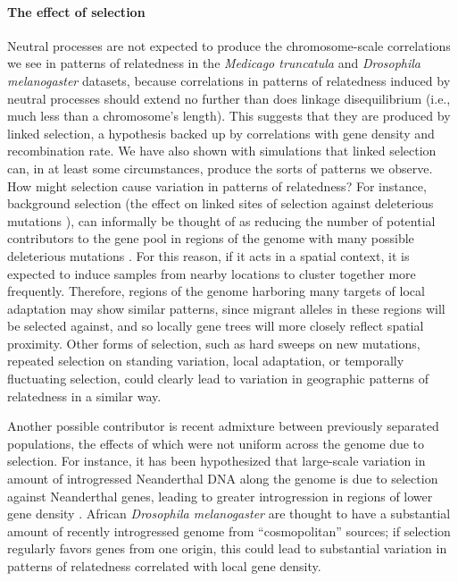 \documentclass[11pt, oneside]{article}   	%
\newcommand\citet{\cite}
\newcommand\citep{\cite}
\renewcommand{\revpoint}[2]{\relax}
\renewcommand{\llabel}[1]{\relax}
\begin{document}
\paragraph{The effect of selection}
Neutral processes are not expected to produce the chromosome-scale correlations we see in
patterns of relatedness 
in the \textit{Medicago truncatula} and \textit{Drosophila melanogaster} datasets, \llabel{ll:not_neutral}
because correlations in patterns of relatedness induced by neutral processes \revpoint{AE}{4}
should extend no further than does linkage disequilibrium
(i.e., much less than a chromosome's length).
This suggests that they are produced by linked selection,
a hypothesis backed up by correlations with gene density and recombination rate.
We have also shown with simulations that linked selection can, in at least some circumstances,
produce the sorts of patterns we observe.
How might selection cause variation in patterns of relatedness?
For instance, background selection
(the effect on linked sites of selection against deleterious mutations
\citet{charlesworth1993effect,charlesworth2013background}),
can informally be thought of as reducing the number of potential contributors to the gene pool 
in regions of the genome with many possible deleterious mutations \citep{hudson1995deleterious}.
For this reason, if it acts in a spatial context, it is expected to induce samples from nearby locations to cluster together more frequently.
Therefore, regions of the genome harboring many targets of local adaptation may show similar patterns,
since migrant alleles in these regions will be selected against,
and so locally gene trees will more closely reflect spatial proximity.
Other forms of selection, such as hard sweeps on new mutations,
repeated selection on standing variation, local adaptation,
or temporally fluctuating selection,
could clearly lead to variation 
in geographic patterns of relatedness in a similar way.

Another possible contributor is recent admixture between previously separated populations,
the effects of which were not uniform across the genome due to selection. %
For instance, it has been hypothesized that large-scale variation in amount of introgressed Neanderthal DNA along the genome
is due to selection against Neanderthal genes, leading to greater introgression in regions of lower gene density
\citep{harris2016genetic,juric2016strength}.
African \textit{Drosophila melanogaster} are thought to have a substantial amount of recently introgressed genome from ``cosmopolitan'' sources;
if selection regularly favors genes from one origin,
this could lead to substantial variation in patterns of relatedness correlated with local gene density.
\end{document}
